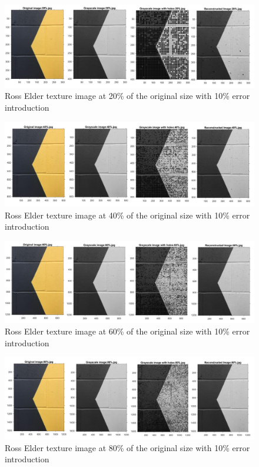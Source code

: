 
\begin{figure}[!ht]
\center \includegraphics[scale=0.31]{RossElder20.jpg}
\caption{Ross Elder texture image at 20\% of the original size with 10\% error introduction}
\label{fig:RossElder20}
\end{figure}

\begin{figure}[!ht]
\center \includegraphics[scale=0.31]{RossElder40.jpg}
\caption{Ross Elder texture image at 40\% of the original size with 10\% error introduction}
\label{fig:RossElder40}
\end{figure}

\begin{figure}[!ht]
\center \includegraphics[scale=0.31]{RossElder60.jpg}
\caption{Ross Elder texture image at 60\% of the original size with 10\% error introduction}
\label{fig:RossElder60}
\end{figure}

\begin{figure}[!ht]
\center \includegraphics[scale=0.31]{RossElder80.jpg}
\caption{Ross Elder texture image at 80\% of the original size with 10\% error introduction}
\label{fig:RossElder80}
\end{figure}

